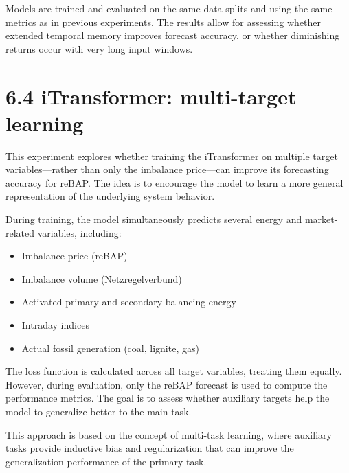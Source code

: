 \documentclass[class=scrbook, crop=false]{standalone}
\begin{document}
Models are trained and evaluated on the same data splits and using the same metrics as in previous experiments. The results allow for assessing whether extended temporal memory improves forecast accuracy, or whether diminishing returns occur with very long input windows.

   

\section{6.4 iTransformer: multi-target learning}
This experiment explores whether training the iTransformer on multiple target variables—rather than only the imbalance price—can improve its forecasting accuracy for reBAP. The idea is to encourage the model to learn a more general representation of the underlying system behavior.

During training, the model simultaneously predicts several energy and market-related variables, including:
\begin{itemize}
\item Imbalance price (reBAP)
\item Imbalance volume (Netzregelverbund)
\item Activated primary and secondary balancing energy
\item Intraday indices 
\item Actual fossil generation (coal, lignite, gas)
\end{itemize}

The loss function is calculated across all target variables, treating them equally. However, during evaluation, only the reBAP forecast is used to compute the performance metrics. The goal is to assess whether auxiliary targets help the model to generalize better to the main task.

This approach is based on the concept of multi-task learning, where auxiliary tasks provide inductive bias and regularization that can improve the generalization performance of the primary task.
\end{document}
